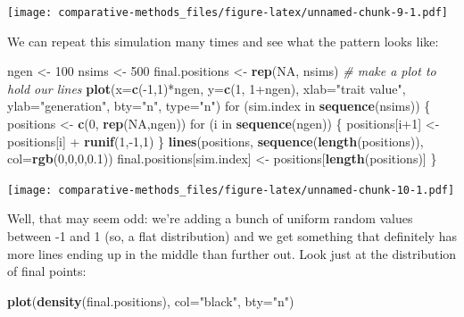 \documentclass[]{book}
\newenvironment{Shaded}{\begin{snugshade}}{\end{snugshade}}
\newcommand{\KeywordTok}[1]{\textcolor[rgb]{0.13,0.29,0.53}{\textbf{{#1}}}}
\newcommand{\DataTypeTok}[1]{\textcolor[rgb]{0.13,0.29,0.53}{{#1}}}
\newcommand{\DecValTok}[1]{\textcolor[rgb]{0.00,0.00,0.81}{{#1}}}
\newcommand{\FloatTok}[1]{\textcolor[rgb]{0.00,0.00,0.81}{{#1}}}
\newcommand{\StringTok}[1]{\textcolor[rgb]{0.31,0.60,0.02}{{#1}}}
\newcommand{\CommentTok}[1]{\textcolor[rgb]{0.56,0.35,0.01}{\textit{{#1}}}}
\newcommand{\OtherTok}[1]{\textcolor[rgb]{0.56,0.35,0.01}{{#1}}}
\newcommand{\NormalTok}[1]{{#1}}
\theoremstyle{definition}
\theoremstyle{definition}
\theoremstyle{remark}
\begin{document}
\texttt{[image: comparative-methods\_files/figure-latex/unnamed-chunk-9-1.pdf]}

We can repeat this simulation many times and see what the pattern looks
like:

\begin{Shaded}
\begin{Highlighting}[]
\NormalTok{ngen <-}\StringTok{ }\DecValTok{100}
\NormalTok{nsims <-}\StringTok{ }\DecValTok{500}
\NormalTok{final.positions <-}\StringTok{ }\KeywordTok{rep}\NormalTok{(}\OtherTok{NA}\NormalTok{, nsims)}
\CommentTok{# make a plot to hold our lines}
\KeywordTok{plot}\NormalTok{(}\DataTypeTok{x=}\KeywordTok{c}\NormalTok{(-}\DecValTok{1}\NormalTok{,}\DecValTok{1}\NormalTok{)*ngen, }\DataTypeTok{y=}\KeywordTok{c}\NormalTok{(}\DecValTok{1}\NormalTok{, }\DecValTok{1}\NormalTok{+ngen), }\DataTypeTok{xlab=}\StringTok{"trait value"}\NormalTok{, }\DataTypeTok{ylab=}\StringTok{"generation"}\NormalTok{, }\DataTypeTok{bty=}\StringTok{"n"}\NormalTok{, }\DataTypeTok{type=}\StringTok{"n"}\NormalTok{)}
\NormalTok{for (sim.index in }\KeywordTok{sequence}\NormalTok{(nsims)) \{}
  \NormalTok{positions <-}\StringTok{ }\KeywordTok{c}\NormalTok{(}\DecValTok{0}\NormalTok{, }\KeywordTok{rep}\NormalTok{(}\OtherTok{NA}\NormalTok{,ngen))}
  \NormalTok{for (i in }\KeywordTok{sequence}\NormalTok{(ngen)) \{}
    \NormalTok{positions[i}\DecValTok{+1}\NormalTok{] <-}\StringTok{ }\NormalTok{positions[i] +}\StringTok{ }\KeywordTok{runif}\NormalTok{(}\DecValTok{1}\NormalTok{,-}\DecValTok{1}\NormalTok{,}\DecValTok{1}\NormalTok{)}
  \NormalTok{\}}
  \KeywordTok{lines}\NormalTok{(positions, }\KeywordTok{sequence}\NormalTok{(}\KeywordTok{length}\NormalTok{(positions)), }\DataTypeTok{col=}\KeywordTok{rgb}\NormalTok{(}\DecValTok{0}\NormalTok{,}\DecValTok{0}\NormalTok{,}\DecValTok{0}\NormalTok{,}\FloatTok{0.1}\NormalTok{))}
  \NormalTok{final.positions[sim.index] <-}\StringTok{ }\NormalTok{positions[}\KeywordTok{length}\NormalTok{(positions)]}
\NormalTok{\}}
\end{Highlighting}
\end{Shaded}

\texttt{[image: comparative-methods\_files/figure-latex/unnamed-chunk-10-1.pdf]}

Well, that may seem odd: we're adding a bunch of uniform random values
between -1 and 1 (so, a flat distribution) and we get something that
definitely has more lines ending up in the middle than further out. Look
just at the distribution of final points:

\begin{Shaded}
\begin{Highlighting}[]
\KeywordTok{plot}\NormalTok{(}\KeywordTok{density}\NormalTok{(final.positions), }\DataTypeTok{col=}\StringTok{"black"}\NormalTok{, }\DataTypeTok{bty=}\StringTok{"n"}\NormalTok{)}
\end{Highlighting}
\end{Shaded}
\end{document}
